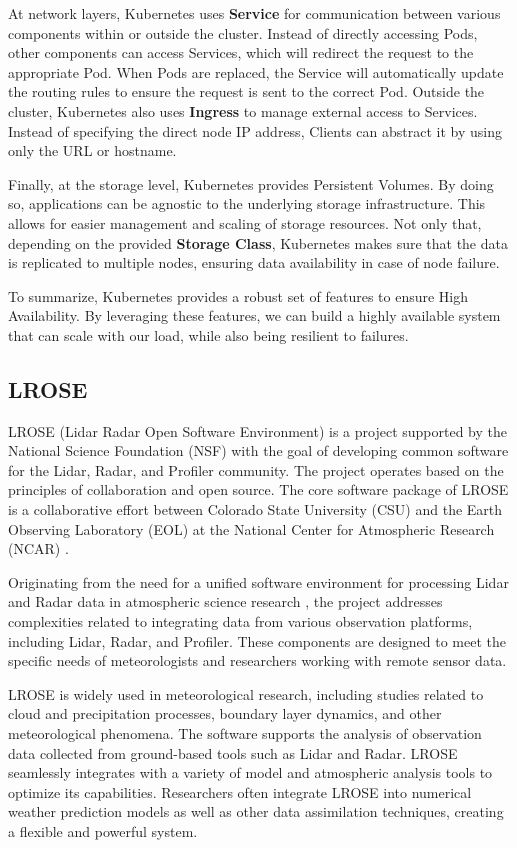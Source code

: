 At network layers, Kubernetes uses \textbf{Service} for communication between
various components within or outside the cluster. Instead of directly accessing
Pods, other components can access Services, which will redirect the request to
the appropriate Pod. When Pods are replaced, the Service will automatically
update the routing rules to ensure the request is sent to the correct Pod.
Outside the cluster, Kubernetes also uses \textbf{Ingress} to manage external
access to Services. Instead of specifying the direct node IP address, Clients
can abstract it by using only the URL or hostname.

Finally, at the storage level, Kubernetes provides Persistent Volumes. By doing
so, applications can be agnostic to the underlying storage infrastructure. This
allows for easier management and scaling of storage resources. Not only that,
depending on the provided \textbf{Storage Class}, Kubernetes makes sure that the
data is replicated to multiple nodes, ensuring data availability in case of node
failure.

To summarize, Kubernetes provides a robust set of features to ensure High
Availability. By leveraging these features, we can build a highly available
system that can scale with our load, while also being resilient to failures.

\subsection{LROSE}
LROSE (Lidar Radar Open Software Environment) is a project supported by the
National Science Foundation (NSF) with the goal of developing common software
for the Lidar, Radar, and Profiler community. The project operates based on the
principles of collaboration and open source. The core software package of LROSE
is a collaborative effort between Colorado State University (CSU) and the Earth
Observing Laboratory (EOL) at the National Center for Atmospheric Research
(NCAR) \cite{lrose}.

Originating from the need for a unified software environment for processing
Lidar and Radar data in atmospheric science research \cite{lrose}, the project
addresses complexities related to integrating data from various observation
platforms, including Lidar, Radar, and Profiler. These components are designed
to meet the specific needs of meteorologists and researchers working with remote
sensor data.

LROSE is widely used in meteorological research, including studies related to
cloud and precipitation processes, boundary layer dynamics, and other
meteorological phenomena. The software supports the analysis of observation data
collected from ground-based tools such as Lidar and Radar. LROSE seamlessly
integrates with a variety of model and atmospheric analysis tools to optimize
its capabilities. Researchers often integrate LROSE into numerical weather
prediction models as well as other data assimilation techniques, creating a
flexible and powerful system.

